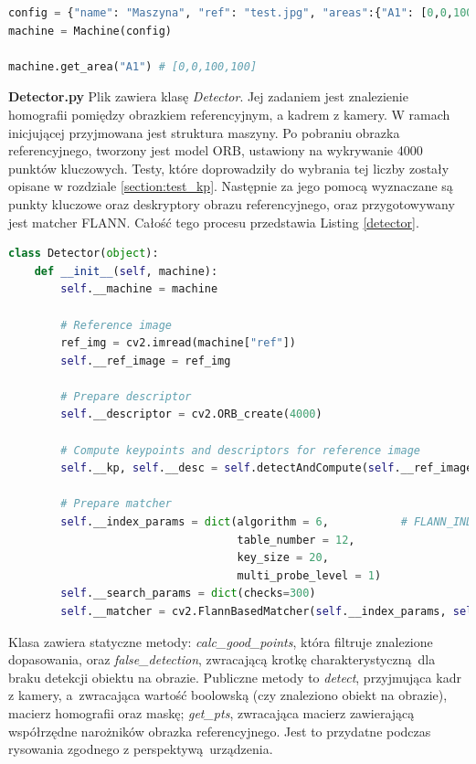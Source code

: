 \documentclass[12pt,twoside,polish]{article}
\begin{document}
\begin{lstlisting}[language=Python,label=mach, caption=Stworzenie instancji Machine]
config = {"name": "Maszyna", "ref": "test.jpg", "areas":{"A1": [0,0,100,100]}}
machine = Machine(config)

machine.get_area("A1") # [0,0,100,100]
\end{lstlisting}

\textbf{Detector.py}
Plik zawiera klasę \emph{Detector}. Jej zadaniem jest znalezienie homografii pomiędzy obrazkiem referencyjnym, a kadrem z kamery. W ramach inicjującej przyjmowana jest struktura maszyny. Po pobraniu obrazka referencyjnego, tworzony jest model ORB, ustawiony na wykrywanie 4000 punktów kluczowych. Testy, które doprowadziły do wybrania tej liczby zostały opisane w rozdziale \ref{section:test_kp}. Następnie za jego pomocą wyznaczane są punkty kluczowe oraz deskryptory obrazu referencyjnego, oraz przygotowywany jest matcher FLANN. Całość tego procesu przedstawia Listing \ref{detector}.

\begin{lstlisting}[language=Python,caption=Stworzenie instancji Detector,label=detector]
class Detector(object):
	def __init__(self, machine):
		self.__machine = machine

		# Reference image
		ref_img = cv2.imread(machine["ref"])
		self.__ref_image = ref_img
		
		# Prepare descriptor
		self.__descriptor = cv2.ORB_create(4000)
		
		# Compute keypoints and descriptors for reference image
		self.__kp, self.__desc = self.detectAndCompute(self.__ref_image)

		# Prepare matcher
		self.__index_params = dict(algorithm = 6,           # FLANN_INDEX_LSH
							       table_number = 12,
								   key_size = 20,
								   multi_probe_level = 1)
		self.__search_params = dict(checks=300)
		self.__matcher = cv2.FlannBasedMatcher(self.__index_params, self.__search_params)
\end{lstlisting}

Klasa zawiera statyczne metody: \emph{calc\_good\_points}, która filtruje znalezione dopasowania, oraz \emph{false\_detection}, zwracającą krotkę charakterystyczną dla braku detekcji obiektu na obrazie. Publiczne metody to \emph{detect}, przyjmująca kadr z kamery, a~zwracająca wartość boolowską (czy znaleziono obiekt na obrazie), macierz homografii oraz maskę; \emph{get\_pts}, zwracająca macierz zawierającą współrzędne narożników obrazka referencyjnego. Jest to przydatne podczas rysowania zgodnego z perspektywą urządzenia.
\end{document}
